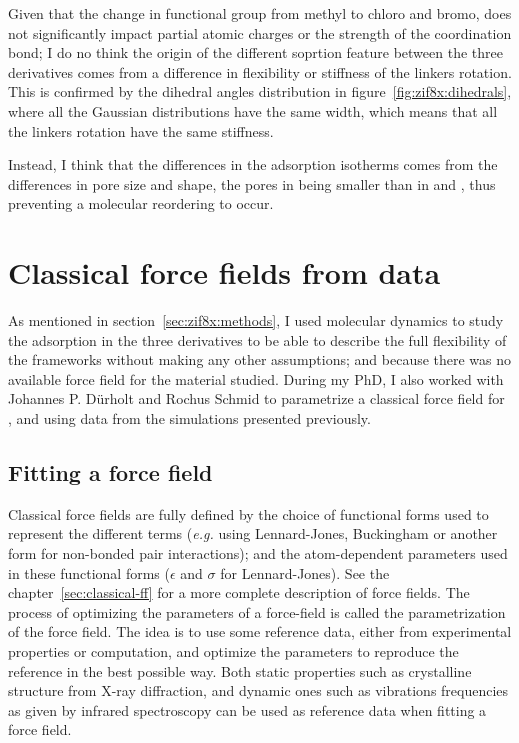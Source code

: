 \documentclass[thesis]{subfiles}
\begin{document}
Given that the change in functional group from methyl to chloro and bromo, does
not significantly impact partial atomic charges or the strength of the 
coordination bond; I do no think the origin of the different soprtion feature
between the three  derivatives comes from a difference in flexibility or
stiffness of the linkers rotation. This is confirmed by the dihedral angles
distribution in figure~\ref{fig:zif8x:dihedrals}, where all the Gaussian
distributions have the same width, which means that all the linkers rotation
have the same stiffness.

Instead, I think that the differences in the adsorption isotherms comes from the
differences in pore size and shape, the pores in \ZIFBr being smaller than in
\ZIFCl and , thus preventing a molecular reordering to occur.

\section{Classical force fields from \abinitio data}
\label{sec:classical-ff-parametrize}

As mentioned in section~\ref{sec:zif8x:methods}, I used \abinitio molecular
dynamics to study the adsorption in the three  derivatives to be able to
describe the full flexibility of the frameworks without making any other
assumptions; and because there was no available force field for the material
studied. During my PhD, I also worked with Johannes P. Dürholt and Rochus Schmid
to parametrize a classical force field for , \ZIFCl and \ZIFBr using data
from the \abinitio simulations presented previously.

\subsection{Fitting a force field}

Classical force fields are fully defined by the choice of functional forms used
to represent the different terms (\emph{e.g.} using Lennard-Jones, Buckingham or
another form for non-bonded pair interactions); and the atom-dependent
parameters used in these functional forms ($\epsilon$ and $\sigma$ for
Lennard-Jones). See the chapter~\ref{sec:classical-ff} for a more complete
description of force fields. The process of optimizing the parameters of a
force-field is called the parametrization of the force field. The idea is to use
some reference data, either from experimental properties or \abinitio
computation, and optimize the parameters to reproduce the reference in the best
possible way. Both static properties such as crystalline structure from X-ray
diffraction, and dynamic ones such as vibrations frequencies as given by
infrared spectroscopy can be used as reference data when fitting a force field.
\end{document}
